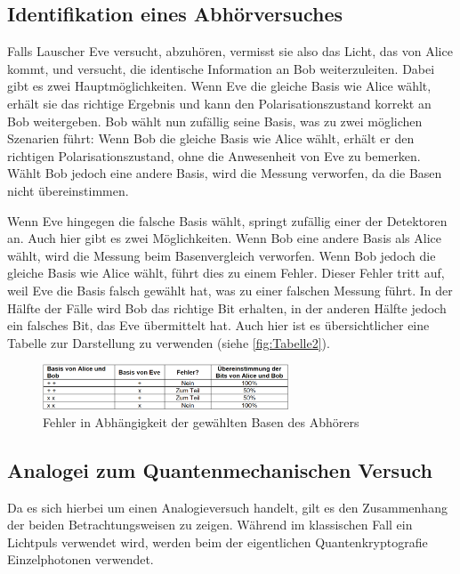 \subsection{Identifikation eines Abhörversuches}

Falls Lauscher Eve versucht, abzuhören, vermisst sie also das Licht, das von Alice kommt, und versucht, die identische Information an Bob weiterzuleiten. Dabei gibt es zwei Hauptmöglichkeiten. Wenn Eve die gleiche Basis wie Alice wählt, erhält sie das richtige Ergebnis und kann den Polarisationszustand korrekt an Bob weitergeben. Bob wählt nun zufällig seine Basis, was zu zwei möglichen Szenarien führt: Wenn Bob die gleiche Basis wie Alice wählt, erhält er den richtigen Polarisationszustand, ohne die Anwesenheit von Eve zu bemerken. Wählt Bob jedoch eine andere Basis, wird die Messung verworfen, da die Basen nicht übereinstimmen.

Wenn Eve hingegen die falsche Basis wählt, springt zufällig einer der Detektoren an. Auch hier gibt es zwei Möglichkeiten. Wenn Bob eine andere Basis als Alice wählt, wird die Messung beim Basenvergleich verworfen. Wenn Bob jedoch die gleiche Basis wie Alice wählt, führt dies zu einem Fehler. Dieser Fehler tritt auf, weil Eve die Basis falsch gewählt hat, was zu einer falschen Messung führt. In der Hälfte der Fälle wird Bob das richtige Bit erhalten, in der anderen Hälfte jedoch ein falsches Bit, das Eve übermittelt hat.
Auch hier ist es übersichtlicher eine Tabelle zur Darstellung zu verwenden (siehe \autoref{fig:Tabelle2}).
\begin{figure}[H]
	\centering
	\includegraphics[width=0.65\textwidth]{content/grafik/Tabelle2.png}
	\caption{Fehler in Abhängigkeit der gewählten Basen des Abhörers \cite{krypt}}
	\label{fig:Tabelle2}
\end{figure}

\subsection{Analogei zum Quantenmechanischen Versuch}
Da es sich hierbei um einen Analogieversuch handelt, gilt es den Zusammenhang der beiden Betrachtungsweisen zu zeigen. Während im klassischen Fall ein Lichtpuls verwendet wird, werden beim der eigentlichen Quantenkryptografie Einzelphotonen verwendet.
